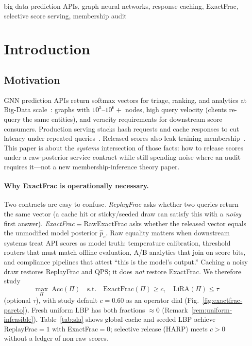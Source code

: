 \documentclass[conference]{IEEEtran}
\begin{document}
\begin{IEEEkeywords}
big data prediction APIs, graph neural networks, response caching, ExactFrac, selective score serving, membership audit
\end{IEEEkeywords}

\section{Introduction}

\subsection{Motivation}
GNN prediction APIs return softmax vectors for triage, ranking, and analytics at Big-Data scale~\cite{kipf2017gcn,hamilton2017graphsage,hu2020ogb}: graphs with $10^3$--$10^6+$ nodes, high query velocity (clients re-query the same entities), and veracity requirements for downstream score consumers.
Production serving stacks hash requests and cache responses to cut latency under repeated queries~\cite{crankshaw2017clipper,triton2024cache}.
Released scores also leak training membership~\cite{shokri2017membership,salem2019mlleaks,carlini2022membership,olatunji2021mia}.
This paper is about the \emph{systems} intersection of those facts: how to release scores under a raw-posterior service contract while still spending noise where an audit requires it---not a new membership-inference theory paper.

\paragraph{Why ExactFrac is operationally necessary.}
Two contracts are easy to confuse.
\emph{ReplayFrac} asks whether two queries return the same vector (a cache hit or sticky/seeded draw can satisfy this with a \emph{noisy} first answer).
\emph{ExactFrac}$\equiv$RawExactFrac asks whether the released vector equals the unmodified model posterior $\hat p_v$.
Raw equality matters when downstream systems treat API scores as model truth: temperature calibration, threshold routers that must match offline evaluation, A/B analytics that join on score bits, and compliance pipelines that attest ``this is the model's output.''
Caching a noisy draw restores ReplayFrac and QPS; it does \emph{not} restore ExactFrac.
We therefore study
\[
\max_{\Pi}\;\mathrm{Acc}(\Pi)
\quad\text{s.t.}\quad
\mathrm{ExactFrac}(\Pi)\ge c,
\quad
\mathrm{LiRA}(\Pi)\le\tau
\]
(optional $\tau$), with study default $c{=}0.60$ as an operator dial (Fig.~\ref{fig:exactfrac-pareto}).
Fresh uniform LBP has both fractions ${\approx}0$ (Remark~\ref{rem:uniform-infeasible}).
Table~\ref{tab:sla} shows global-cache and seeded LBP achieve ReplayFrac${=}1$ with ExactFrac${=}0$; selective release (HARP) meets $c{>}0$ without a ledger of non-raw scores.
\end{document}
